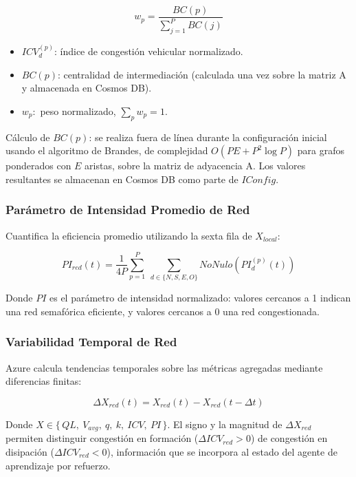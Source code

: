 \documentclass[12pt,a4paper,oneside]{report}
\begin{document}
\begin{equation}
w_{p} = \frac{BC(p)}{\displaystyle\sum_{j = 1}^{P}BC(j)}
\label{eq:wp}
\end{equation}

\begin{itemize}
\item
  \(ICV_{d}^{(p)}\): índice de congestión vehicular normalizado.
\item
  \(BC(p)\): centralidad de intermediación (calculada una vez sobre la matriz A y almacenada en Cosmos DB).
\item
  \(w_{p}:\) peso normalizado, \(\sum_{p} w_{p} = 1\).
\end{itemize}

Cálculo de \(BC(p)\): se realiza fuera de línea durante la configuración inicial usando el algoritmo de Brandes, de complejidad \(O(PE + P^{2}\log P)\) para grafos ponderados con \(E\) aristas, sobre la matriz de adyacencia A. Los valores resultantes se almacenan en Cosmos DB como parte de \(IConfig\).

\subsubsection{Parámetro de Intensidad Promedio de Red}

Cuantifica la eficiencia promedio utilizando la sexta fila de \(X_{local}\):

\begin{equation}
PI_{red}(t) = \frac{1}{4P}\sum_{p = 1}^{P}\ \sum_{d \in \{N, S, E, O\}} NoNulo\!\left(PI_{d}^{(p)}(t)\right)
\label{eq:pired}
\end{equation}

Donde \(PI\) es el parámetro de intensidad normalizado: valores cercanos a 1 indican una red semafórica eficiente, y valores cercanos a 0 una red congestionada.

\subsubsection{Variabilidad Temporal de Red}

Azure calcula tendencias temporales sobre las métricas agregadas mediante diferencias finitas:

\begin{equation}
\Delta X_{red}(t) = X_{red}(t) - X_{red}(t - \Delta t)
\label{eq:tendencia}
\end{equation}

Donde \(X \in \{\, QL,\ V_{avg},\ q,\ k,\ ICV,\ PI \,\}\). El signo y la magnitud de \(\Delta X_{red}\) permiten distinguir congestión en formación (\(\Delta ICV_{red} > 0\)) de congestión en disipación (\(\Delta ICV_{red} < 0\)), información que se incorpora al estado del agente de aprendizaje por refuerzo.
\end{document}
